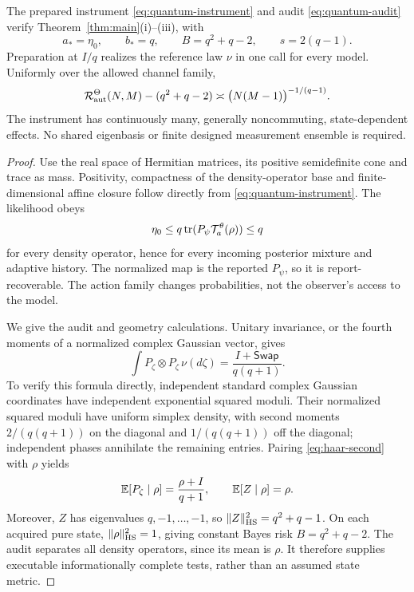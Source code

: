 \begin{theorem}\label{thm:quantum}
The prepared instrument \eqref{eq:quantum-instrument} and audit \eqref{eq:quantum-audit} verify Theorem~\ref{thm:main}(i)--(iii), with
\[
 a_*=\eta_0,\qquad b_*=q,\qquad B=q^2+q-2,
 \qquad s=2(q-1).
\]
Preparation at $I/q$ realizes the reference law $\nu$ in one call for every model. Uniformly over the allowed channel family,
\begin{equation}\label{eq:quantum-rate}
 \mathcal R_{\mathrm{aut}}^\Theta(N,M)-(q^2+q-2)
       \asymp \bigl(N(M-1)\bigr)^{-1/(q-1)}.
\end{equation}
The instrument has continuously many, generally noncommuting, state-dependent effects. No shared eigenbasis or finite designed measurement ensemble is required.
\end{theorem}
\begin{proof}
Use the real space of Hermitian matrices, its positive semidefinite cone and trace as mass. Positivity, compactness of the density-operator base and finite-dimensional affine closure follow directly from \eqref{eq:quantum-instrument}. The likelihood obeys
\[
 \eta_0\le q\operatorname{tr}(P_\psi\mathcal T_a^\theta(\rho))\le q
\]
for every density operator, hence for every incoming posterior mixture and adaptive history. The normalized map is the reported $P_\psi$, so it is report-recoverable. The action family changes probabilities, not the observer's access to the model.

We give the audit and geometry calculations. Unitary invariance, or the fourth moments of a normalized complex Gaussian vector, gives
\begin{equation}\label{eq:haar-second}
 \int P_\zeta\otimes P_\zeta\,\nu(d\zeta)
       =\frac{I+\mathsf{Swap}}{q(q+1)}.
\end{equation}
To verify this formula directly, independent standard complex Gaussian coordinates have independent exponential squared moduli. Their normalized squared moduli have uniform simplex density, with second moments $2/(q(q+1))$ on the diagonal and $1/(q(q+1))$ off the diagonal; independent phases annihilate the remaining entries. Pairing \eqref{eq:haar-second} with $\rho$ yields
\[
 \mathbb E[P_\zeta\mid\rho]=\frac{\rho+I}{q+1},\qquad \mathbb E[Z\mid\rho]=\rho.
\]
Moreover, $Z$ has eigenvalues $q,-1,\ldots,-1$, so $\lVert Z\rVert_{\mathrm{HS}}^2=q^2+q-1$. On each acquired pure state, $\lVert \rho\rVert_{\mathrm{HS}}^2=1$, giving constant Bayes risk $B=q^2+q-2$. The audit separates all density operators, since its mean is $\rho$. It therefore supplies executable informationally complete tests, rather than an assumed state metric.


\end{proof}
